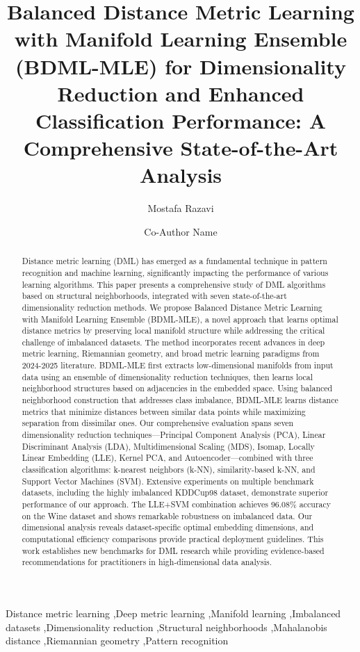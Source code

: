 \documentclass[review]{elsarticle}
\begin{document}
\begin{frontmatter}

\title{Balanced Distance Metric Learning with Manifold Learning Ensemble (BDML-MLE) for Dimensionality Reduction and Enhanced Classification Performance: A Comprehensive State-of-the-Art Analysis}

\author[1]{Mostafa Razavi}
\author[2]{Co-Author Name}

\address[1]{Department of Computer Science, University Name}
\address[2]{Department of Mathematics, University Name}

\begin{abstract}
Distance metric learning (DML) has emerged as a fundamental technique in pattern recognition and machine learning, significantly impacting the performance of various learning algorithms. This paper presents a comprehensive study of DML algorithms based on structural neighborhoods, integrated with seven state-of-the-art dimensionality reduction methods. We propose Balanced Distance Metric Learning with Manifold Learning Ensemble (BDML-MLE), a novel approach that learns optimal distance metrics by preserving local manifold structure while addressing the critical challenge of imbalanced datasets. The method incorporates recent advances in deep metric learning, Riemannian geometry, and broad metric learning paradigms from 2024-2025 literature. BDML-MLE first extracts low-dimensional manifolds from input data using an ensemble of dimensionality reduction techniques, then learns local neighborhood structures based on adjacencies in the embedded space. Using balanced neighborhood construction that addresses class imbalance, BDML-MLE learns distance metrics that minimize distances between similar data points while maximizing separation from dissimilar ones. Our comprehensive evaluation spans seven dimensionality reduction techniques—Principal Component Analysis (PCA), Linear Discriminant Analysis (LDA), Multidimensional Scaling (MDS), Isomap, Locally Linear Embedding (LLE), Kernel PCA, and Autoencoder—combined with three classification algorithms: k-nearest neighbors (k-NN), similarity-based k-NN, and Support Vector Machines (SVM). Extensive experiments on multiple benchmark datasets, including the highly imbalanced KDDCup98 dataset, demonstrate superior performance of our approach. The LLE+SVM combination achieves 96.08\% accuracy on the Wine dataset and shows remarkable robustness on imbalanced data. Our dimensional analysis reveals dataset-specific optimal embedding dimensions, and computational efficiency comparisons provide practical deployment guidelines. This work establishes new benchmarks for DML research while providing evidence-based recommendations for practitioners in high-dimensional data analysis.
\end{abstract}

\begin{keyword}
Distance metric learning \sep Deep metric learning \sep Manifold learning \sep Imbalanced datasets \sep Dimensionality reduction \sep Structural neighborhoods \sep Mahalanobis distance \sep Riemannian geometry \sep Pattern recognition
\end{keyword}

\end{frontmatter}
\end{document}
